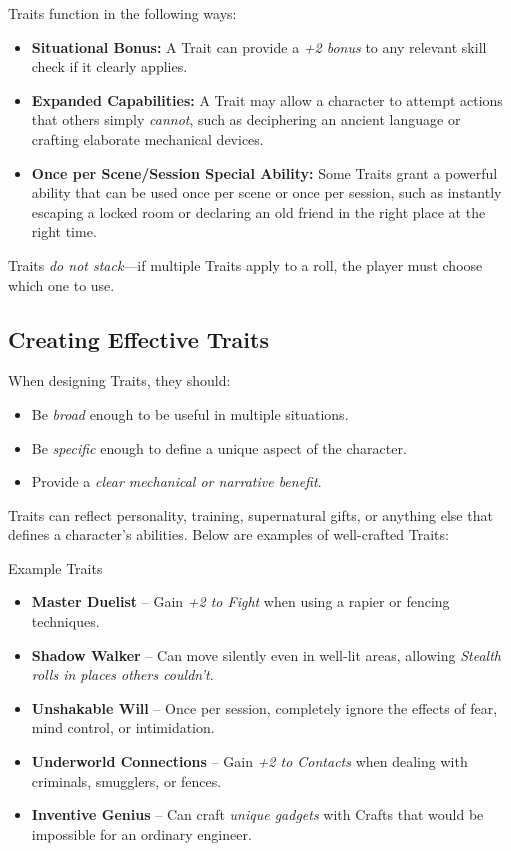 Traits function in the following ways:

\begin{itemize}
    \item \textbf{Situational Bonus:} A Trait can provide a \emph{+2 bonus} to any relevant skill check if it clearly applies.
    \item \textbf{Expanded Capabilities:} A Trait may allow a character to attempt actions that others simply \emph{cannot}, such as deciphering an ancient language or crafting elaborate mechanical devices.
    \item \textbf{Once per Scene/Session Special Ability:} Some Traits grant a powerful ability that can be used once per scene or once per session, such as instantly escaping a locked room or declaring an old friend in the right place at the right time.
\end{itemize}

Traits \emph{do not stack}—if multiple Traits apply to a roll, the player must choose which one to use.

\subsection{Creating Effective Traits}

When designing Traits, they should:
\begin{itemize}
    \item Be \emph{broad} enough to be useful in multiple situations.
    \item Be \emph{specific} enough to define a unique aspect of the character.
    \item Provide a \emph{clear mechanical or narrative benefit}.
\end{itemize}

Traits can reflect personality, training, supernatural gifts, or anything else that defines a character’s abilities. Below are examples of well-crafted Traits:

\begin{DndSidebar}[float=!t]{Example Traits}
    \begin{itemize}
        \item \textbf{Master Duelist} – Gain \emph{+2 to Fight} when using a rapier or fencing techniques.
        \item \textbf{Shadow Walker} – Can move silently even in well-lit areas, allowing \emph{Stealth rolls in places others couldn’t}.
        \item \textbf{Unshakable Will} – Once per session, completely ignore the effects of fear, mind control, or intimidation.
        \item \textbf{Underworld Connections} – Gain \emph{+2 to Contacts} when dealing with criminals, smugglers, or fences.
        \item \textbf{Inventive Genius} – Can craft \emph{unique gadgets} with Crafts that would be impossible for an ordinary engineer.
    \end{itemize}
\end{DndSidebar}

